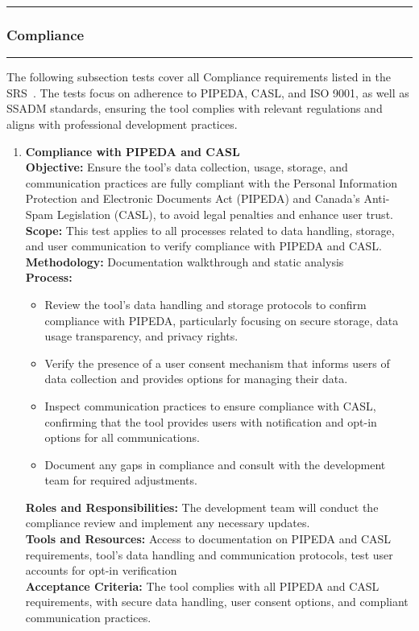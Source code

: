 \documentclass[12pt, titlepage]{article}
\newcommand{\colorrule}{\textcolor{BlueViolet}{\rule{\linewidth}{2pt}}}
\begin{document}
\newpage

\noindent
\colorrule

\subsubsection{Compliance}
\colorrule

\medskip

\noindent
The following subsection tests cover all Compliance requirements listed in the SRS~\cite{SRS}. The tests focus on adherence to PIPEDA, CASL, and ISO 9001, as well as SSADM standards, ensuring the tool complies with relevant regulations and aligns with professional development practices.

\begin{enumerate}[label={\bf \textcolor{Maroon}{test-CPL-\arabic*}}, wide=0pt, font=\itshape]
  \item \textbf{Compliance with PIPEDA and CASL} \\[2mm]
    \textbf{Objective:} Ensure the tool’s data collection, usage, storage, and communication practices are fully compliant with the Personal Information Protection and Electronic Documents Act (PIPEDA) and Canada’s Anti-Spam Legislation (CASL), to avoid legal penalties and enhance user trust. \\[2mm]
    \textbf{Scope:} This test applies to all processes related to data handling, storage, and user communication to verify compliance with PIPEDA and CASL. \\[2mm]
    \textbf{Methodology:} Documentation walkthrough and static analysis \\[2mm]
    \textbf{Process:}
    \begin{itemize}
      \item Review the tool’s data handling and storage protocols to confirm compliance with PIPEDA, particularly focusing on secure storage, data usage transparency, and privacy rights.
      \item Verify the presence of a user consent mechanism that informs users of data collection and provides options for managing their data.
      \item Inspect communication practices to ensure compliance with CASL, confirming that the tool provides users with notification and opt-in options for all communications.
      \item Document any gaps in compliance and consult with the development team for required adjustments.
    \end{itemize}
    \textbf{Roles and Responsibilities:} The development team will conduct the compliance review and implement any necessary updates. \\[2mm]
    \textbf{Tools and Resources:} Access to documentation on PIPEDA and CASL requirements, tool’s data handling and communication protocols, test user accounts for opt-in verification \\[2mm]
    \textbf{Acceptance Criteria:} The tool complies with all PIPEDA and CASL requirements, with secure data handling, user consent options, and compliant communication practices.


\end{enumerate}
\end{document}
